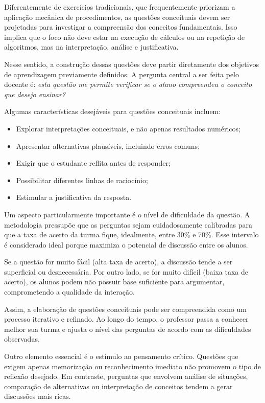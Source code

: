 Diferentemente de exercícios tradicionais, que frequentemente priorizam a aplicação mecânica de procedimentos, as questões conceituais devem ser projetadas para investigar a compreensão dos conceitos fundamentais. Isso implica que o foco não deve estar na execução de cálculos ou na repetição de algoritmos, mas na interpretação, análise e justificativa.

Nesse sentido, a construção dessas questões deve partir diretamente dos objetivos de aprendizagem previamente definidos. A pergunta central a ser feita pelo docente é: \textit{esta questão me permite verificar se o aluno compreendeu o conceito que desejo ensinar?}

Algumas características desejáveis para questões conceituais incluem:

\begin{itemize}
    \item Explorar interpretações conceituais, e não apenas resultados numéricos;
    \item Apresentar alternativas plausíveis, incluindo erros comuns;
    \item Exigir que o estudante reflita antes de responder;
    \item Possibilitar diferentes linhas de raciocínio;
    \item Estimular a justificativa da resposta.
\end{itemize}

Um aspecto particularmente importante é o nível de dificuldade da questão. A metodologia pressupõe que as perguntas sejam cuidadosamente calibradas para que a taxa de acerto da turma fique, idealmente, entre 30\% e 70\%. Esse intervalo é considerado ideal porque maximiza o potencial de discussão entre os alunos.

Se a questão for muito fácil (alta taxa de acerto), a discussão tende a ser superficial ou desnecessária. Por outro lado, se for muito difícil (baixa taxa de acerto), os alunos podem não possuir base suficiente para argumentar, comprometendo a qualidade da interação.

Assim, a elaboração de questões conceituais pode ser compreendida como um processo iterativo e refinado. Ao longo do tempo, o professor passa a conhecer melhor sua turma e ajusta o nível das perguntas de acordo com as dificuldades observadas.

Outro elemento essencial é o estímulo ao pensamento crítico. Questões que exigem apenas memorização ou reconhecimento imediato não promovem o tipo de reflexão desejado. Em contraste, perguntas que envolvem análise de situações, comparação de alternativas ou interpretação de conceitos tendem a gerar discussões mais ricas.

